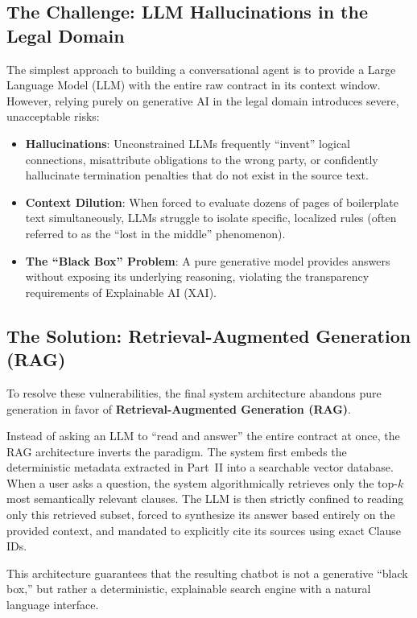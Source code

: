 \documentclass[twoside,final]{hcmut-report}
\begin{document}
\subsection{The Challenge: LLM Hallucinations in the Legal Domain}
The simplest approach to building a conversational agent is to provide a Large Language Model (LLM) with the entire raw contract in its context window. However, relying purely on generative AI in the legal domain introduces severe, unacceptable risks:
\begin{itemize}[topsep=0pt, parsep=0pt, itemsep=0pt]
  \item \textbf{Hallucinations}: Unconstrained LLMs frequently ``invent'' logical connections, misattribute obligations to the wrong party, or confidently hallucinate termination penalties that do not exist in the source text.
  \item \textbf{Context Dilution}: When forced to evaluate dozens of pages of boilerplate text simultaneously, LLMs struggle to isolate specific, localized rules (often referred to as the ``lost in the middle'' phenomenon).
  \item \textbf{The ``Black Box'' Problem}: A pure generative model provides answers without exposing its underlying reasoning, violating the transparency requirements of Explainable AI (XAI).
\end{itemize}

\subsection{The Solution: Retrieval-Augmented Generation (RAG)}
To resolve these vulnerabilities, the final system architecture abandons pure generation in favor of \textbf{Retrieval-Augmented Generation (RAG)}.

Instead of asking an LLM to ``read and answer'' the entire contract at once, the RAG architecture inverts the paradigm. The system first embeds the deterministic metadata extracted in Part~II into a searchable vector database. When a user asks a question, the system algorithmically retrieves only the top-$k$ most semantically relevant clauses. The LLM is then strictly confined to reading only this retrieved subset, forced to synthesize its answer based entirely on the provided context, and mandated to explicitly cite its sources using exact Clause IDs.

\medskip

This architecture guarantees that the resulting chatbot is not a generative ``black box,'' but rather a deterministic, explainable search engine with a natural language interface.
\end{document}
